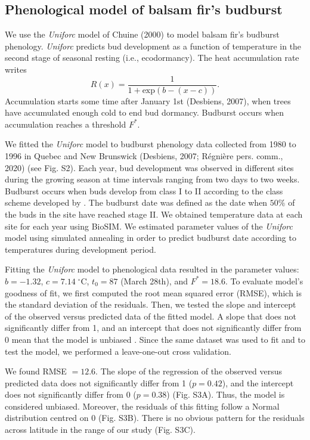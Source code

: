 \documentclass[12 pt]{article}
\begin{document}
\subsection{Phenological model of balsam fir's budburst}
We use the \textit{Uniforc} model of Chuine (2000) to model balsam fir's budburst phenology. \textit{Uniforc} predicts bud development as a function of temperature in the second stage of seasonal resting (i.e., ecodormancy). The heat accumulation rate writes
\begin{equation}
   R(x)=\frac{1}{1+\text{exp}(b-(x-c))}.  \tag*{Eq. S\theequation}
\end{equation}
Accumulation starts some time after January 1st (Desbiens, 2007), when trees have accumulated enough cold to end bud dormancy. Budburst occurs when accumulation reaches a threshold $F^*$. 
\par
We fitted the \textit{Uniforc} model to budburst phenology data collected from 1980 to 1996 in Quebec and New Brunswick (Desbiens, 2007; R\'egni\`ere pers. comm., 2020) (see Fig. S2). Each year, bud development was observed in different sites during the growing season at time intervals ranging from two days to two weeks. Budburst occurs when buds develop from class I to II according to the class scheme developed by \cite{Dorais1982}. The budburst date was defined as the date when $50 \%$ of the buds in the site have reached stage II. We obtained temperature data at each site for each year using BioSIM. We estimated parameter values of the \textit{Uniforc} model using simulated annealing in order to predict budburst date according to temperatures during development period.
\par
Fitting the \textit{Uniforc} model to phenological data resulted in the parameter values: $b = -1.32$, $c = 7.14 \; ^\circ$C, $t_0 = 87$ (March 28th), and $F^* = 18.6$. 
To evaluate model's goodness of fit, we first computed the root mean squared error (RMSE), which is the standard deviation of the residuals. Then, we tested the slope and intercept of the observed versus predicted data of the fitted model. A slope that does not significantly differ from 1, and an intercept that does not significantly differ from 0 mean that the model is unbiased \citep{Pineiro2008}. Since the same dataset was used to fit and to test the model, we performed a leave-one-out cross validation. 
\par
We found RMSE $= 12.6$. The slope of the regression of the observed versus predicted data does not significantly differ from 1 ($p = 0.42$), and the intercept does not significantly differ from 0 ($p = 0.38$) (Fig. S3A). Thus, the model is considered unbiased. Moreover, the residuals of this fitting follow a Normal distribution centred on 0 (Fig. S3B). There is no obvious pattern for the residuals across latitude in the range of our study (Fig. S3C). 
\par
\end{document}
